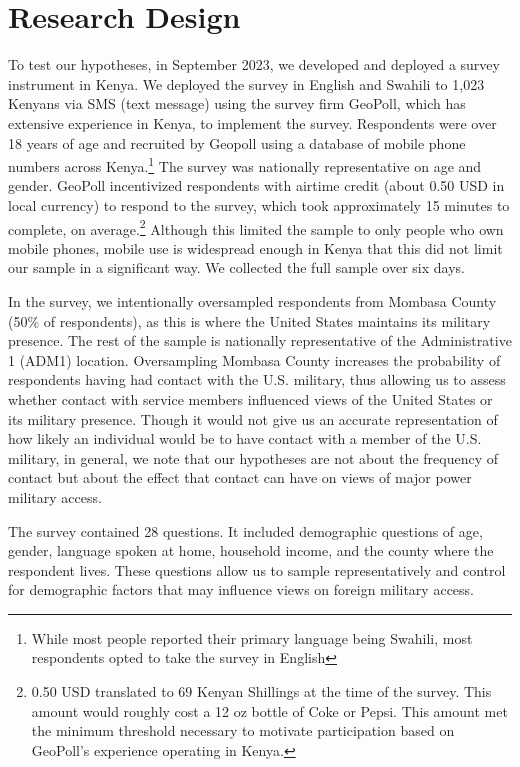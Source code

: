 \section*{Research Design}

To test our hypotheses, in September 2023, we developed and deployed a survey instrument in Kenya. We deployed the survey in English and Swahili to 1,023 Kenyans via SMS (text message) using the survey firm GeoPoll, which has extensive experience in Kenya, to implement the survey. Respondents were over 18 years of age and recruited by Geopoll using a database of mobile phone numbers across Kenya.\footnote{While most people reported their primary language being Swahili, most respondents opted to take the survey in English} The survey was nationally representative on age and gender. GeoPoll incentivized respondents with airtime credit (about 0.50 USD in local currency) to respond to the survey, which took approximately 15 minutes to complete, on average.\footnote{0.50 USD translated to 69 Kenyan Shillings at the time of the survey. This amount would roughly cost a 12 oz bottle of Coke or Pepsi. This amount met the minimum threshold necessary to motivate participation based on GeoPoll's experience operating in Kenya.} Although this limited the sample to only people who own mobile phones, mobile use is widespread enough in Kenya that this did not limit our sample in a significant way. We collected the full sample over six days.  

In the survey, we intentionally oversampled respondents from Mombasa County (50\% of respondents), as this is where the United States maintains its military presence. The rest of the sample is nationally representative of the Administrative 1 (ADM1) location. Oversampling Mombasa County increases the probability of respondents having had contact with the U.S. military, thus allowing us to assess whether contact with service members influenced views of the United States or its military presence. Though it would not give us an accurate representation of how likely an individual would be to have contact with a member of the U.S. military, in general, we note that our hypotheses are not about the frequency of contact but about the effect that contact can have on views of major power military access. 

The survey contained 28 questions. It included demographic questions of age, gender, language spoken at home, household income, and the county where the respondent lives. These questions allow us to sample representatively and control for demographic factors that may influence views on foreign military access.

